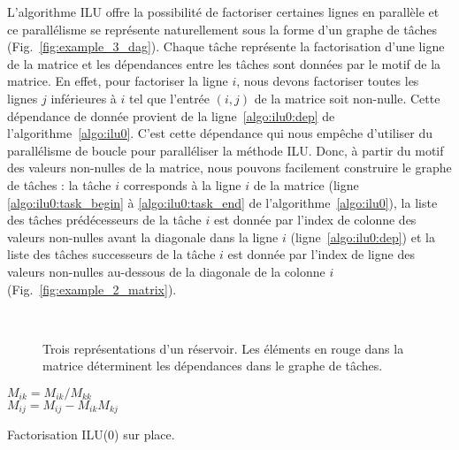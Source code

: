 L'algorithme ILU offre la possibilité de factoriser certaines lignes en parallèle et ce parallélisme se représente naturellement sous la forme d'un graphe de tâches (Fig.~\ref{fig:example_3_dag}).
%
Chaque tâche représente la factorisation d'une ligne de la matrice et les dépendances entre les tâches sont données par le motif de la matrice.
%
En effet, pour factoriser la ligne $i$, nous devons factoriser toutes les lignes $j$ inférieures à $i$ tel que l'entrée $(i,j)$ de la matrice soit non-nulle.
%
Cette dépendance de donnée provient de la ligne~\ref{algo:ilu0:dep} de l'algorithme~\ref{algo:ilu0}.
%
C'est cette dépendance qui nous empêche d'utiliser du parallélisme de boucle pour paralléliser la méthode ILU.
%
Donc, à partir du motif des valeurs non-nulles de la matrice, nous pouvons facilement construire le graphe de tâches :
%
la tâche $i$ corresponds à la ligne $i$ de la matrice (ligne \ref{algo:ilu0:task_begin} à \ref{algo:ilu0:task_end} de l'algorithme~\ref{algo:ilu0}), la liste des tâches prédécesseurs de la tâche $i$ est donnée par l'index de colonne des valeurs non-nulles avant la diagonale dans la ligne $i$ (ligne~\ref{algo:ilu0:dep}) et la liste des tâches successeurs de la tâche $i$ est donnée par l'index de ligne des valeurs non-nulles au-dessous de la diagonale de la colonne $i$ (Fig.~\ref{fig:example_2_matrix}).
\begin{figure}[!h]
     \begin{center}
        ~
        ~
    \end{center}
    \caption{Trois représentations d'un réservoir. Les éléments en rouge dans la matrice déterminent les dépendances dans le graphe de tâches.}
    \label{fig:exemple_3_dag}
\end{figure}
\begin{algorithm}
   {
     { \label{algo:ilu0:task_begin}
      $M_{ik} = M_{ik} / M_{kk}$ \label{algo:ilu0:dep}\\
       {
        $M_{ij} = M_{ij} - M_{ik}M_{kj}$ \\
      }
    } \label{algo:ilu0:task_end}
  }
  \caption{Factorisation ILU(0) sur place.}
  \label{algo:ilu0}
\end{algorithm}

